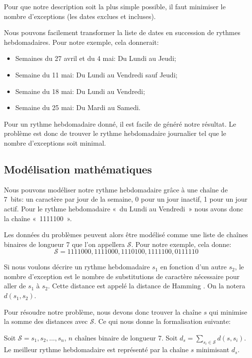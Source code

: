 \documentclass{roadef}
\def\S{\mathcal{S}}
\begin{document}
Pour que notre description soit la plus simple possible, il faut
minimiser le nombre d'exceptions (les dates exclues et incluses).

Nous pouvons facilement transformer la liste de dates en succession de
rythmes hebdomadaires. Pour notre exemple, cela donnerait:
\begin{itemize}
\item Semaines du 27 avril et du 4 mai: Du Lundi au Jeudi;
\item Semaine du 11 mai: Du Lundi au Vendredi sauf Jeudi;
\item Semaine du 18 mai: Du Lundi au Vendredi;
\item Semaine du 25 mai: Du Mardi au Samedi.
\end{itemize}

Pour un rythme hebdomadaire donné, il est facile de généré notre
résultat.  Le problème est donc de trouver le rythme hebdomadaire
journalier tel que le nombre d'exceptions soit minimal.

\subsection{Modélisation mathématiques}

Nous pouvons modéliser notre rythme hebdomadaire grâce à une chaîne de
7~bits: un caractère par jour de la semaine, 0 pour un jour inactif, 1
pour un jour actif. Pour le rythme hebdomadaire «~du Lundi au
Vendredi~» nous avons donc la chaîne «~1111100~».

Les données du problèmes peuvent alors être modélisé comme une liste
de chaînes binaires de longueur 7 que l'on appellera
$\S$. Pour notre exemple, cela donne:
\begin{displaymath}
  \S = 1111000, 1111000, 1110100, 1111100, 0111110
\end{displaymath}

Si nous voulons décrire un rythme hebdomadaire $s_1$ en fonction d'un
autre $s_2$, le nombre d'exception est le nombre de substitutions de
caractère nécessaire pour aller de $s_1$ à $s_2$. Cette distance est
appelé la distance de Hamming \cite{hamming1950error}. On la notera
$d(s_1, s_2)$.

Pour résoudre notre problème, nous devons donc trouver la chaîne $s$
qui minimise la somme des distances avec $\S$. Ce qui nous donne la
formalisation suivante:

Soit $\S = s_1, s_2, \ldots, s_n$, $n$ chaînes binaire de
longueur 7. Soit
\begin{math}
  d_s = \sum_{s_i\in\S} d(s, s_i)
\end{math}.
Le meilleur rythme hebdomadaire est représenté par la chaîne $s$
minimisant $d_s$.
\end{document}
